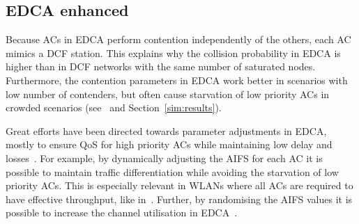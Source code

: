 \documentclass[a4paper]{article}
\begin{document}
\subsection{EDCA enhanced}
Because ACs in EDCA perform contention independently of the others, each AC mimics a DCF station. This explains why the collision probability in EDCA is higher than in DCF networks with the same number of saturated nodes. Furthermore, the contention parameters in EDCA work better in scenarios with low number of contenders, but often cause starvation of low priority ACs in crowded scenarios (see~\cite{990806} and Section~\ref{sim:results}).

Great efforts have been directed towards parameter adjustments in EDCA, mostly to ensure QoS for high priority ACs while maintaining low delay and losses~\cite{throughputGuarantees,6614899,4594854}. For example, by dynamically adjusting the AIFS for each AC it is possible to maintain traffic differentiation while avoiding the starvation of low priority ACs. This is especially relevant in WLANs where all ACs are required to have effective throughput, like in~\cite{6614899}. Further, by randomising the AIFS values it is possible to increase the channel utilisation in EDCA~\cite{4594854}. 
\end{document}
